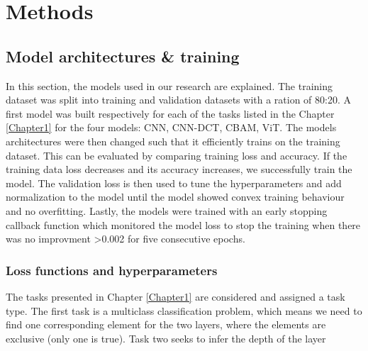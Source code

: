 
\chapter{Methods} %

\label{Chapter3} %







\section{Model architectures \& training}
In this section, the models used in our research are explained.
The training dataset was split into training and validation datasets with a ration of 80:20. A first model was built respectively for each of the tasks listed in the Chapter \ref{Chapter1} for the four models: CNN, CNN-DCT, CBAM, ViT. The models architectures were then changed such that it efficiently trains on the training dataset. This can be evaluated by comparing training loss and accuracy. If the training data loss decreases and its accuracy increases, we successfully train the model.
The validation loss is then used to tune the hyperparameters and add normalization to the model until the model showed convex training behaviour and no overfitting. Lastly, the models were trained with an early stopping callback function which monitored the model loss to stop the training when there was no improvment >0.002 for five consecutive epochs.

\subsection{Loss functions and hyperparameters}
The tasks presented in Chapter \ref{Chapter1} are considered and assigned a task type.
The first task is a multiclass classification problem, which means we need to find one corresponding element for the two layers, where the elements are exclusive (only one is true). Task two seeks to infer the depth of the layer 

